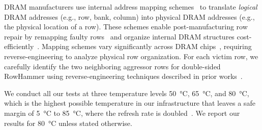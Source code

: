 DRAM manufacturers use internal address mapping schemes~\cite{cojocar2020rowhammer, salp} to translate \emph{logical} DRAM addresses (e.g., row, bank, column) into physical DRAM addresses (e.g., the physical location of a row). These schemes enable post-manufacturing row repair by remapping faulty rows~\cite{hassan2019crow} and organize internal DRAM structures cost-efficiently~\cite{khan2016parbor, vandegoor2002address}. Mapping schemes vary significantly across DRAM chips~\cite{barenghi2018software, cojocar2020rowhammer, horiguchi1997redundancy, itoh2013vlsi, khan2016parbor, kim2014flipping, patel2020beer, orosa2021deeper}, requiring reverse-engineering to analyze physical row organization. For each victim row, we carefully identify the two neighboring aggressor rows for double-sided RowHammer using reverse-engineering techniques described in prior works~\cite{kim2020revisiting, orosa2021deeper, luo2023rowpress}.



{
We conduct all our tests at three temperature levels \SI{50}{\celsius}, \SI{65}{\celsius}, and \SI{80}{\celsius}, which is the highest possible temperature in our infrastructure that leaves a safe margin of \SI{5}{\celsius} to \SI{85}{\celsius}, where the refresh rate is doubled~\cite{jedec2017ddr4}. We report our results for \SI{80}{\celsius} unless stated otherwise.}



